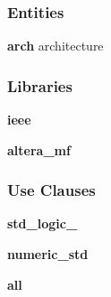 \subsubsection*{Entities}
\begin{DoxyCompactItemize}
\item 
{\bf arch} architecture
\end{DoxyCompactItemize}
\subsubsection*{Libraries}
 \begin{DoxyCompactItemize}
\item 
{\bf ieee} 
\item 
{\bf altera\+\_\+mf} 
\end{DoxyCompactItemize}
\subsubsection*{Use Clauses}
 \begin{DoxyCompactItemize}
\item 
{\bf std\+\_\+logic\+\_}   
\item 
{\bf numeric\+\_\+std}   
\item 
{\bf  all }   
\end{DoxyCompactItemize}
